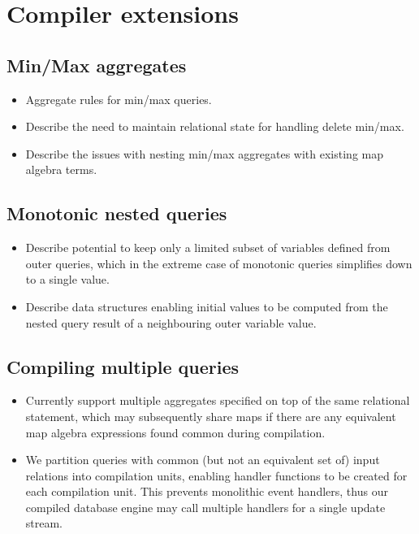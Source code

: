\section{Compiler extensions}
\label{sec:extensions}

\subsection{Min/Max aggregates}
\begin{itemize}
\item Aggregate rules for min/max queries.
\item Describe the need to maintain relational state for handling delete min/max.
\item Describe the issues with nesting min/max aggregates with existing map
  algebra terms.
\end{itemize}

\subsection{Monotonic nested queries}
\begin{itemize}
\item Describe potential to keep only a limited subset of variables defined from
  outer queries, which in the extreme case of monotonic queries simplifies down
  to a single value.
\item Describe data structures enabling initial values to be computed from
  the nested query result of a neighbouring outer variable value.
\end{itemize}

\subsection{Compiling multiple queries}
\begin{itemize}
\item Currently support multiple aggregates specified on top of the same
  relational statement, which may subsequently share maps if there are any
  equivalent map algebra expressions found common during compilation.
\item We partition queries with common (but not an equivalent set of) input
  relations into compilation units, enabling handler functions to be created for
  each compilation unit. This prevents monolithic event handlers, thus our
  compiled database engine may call multiple handlers for a single update stream.
\end{itemize}
